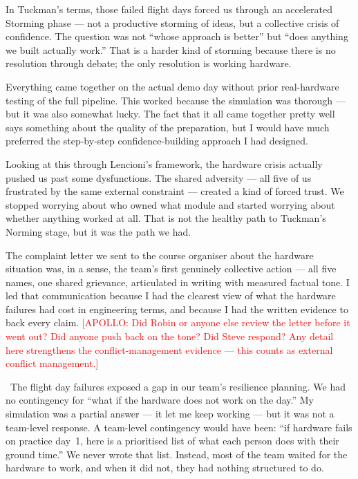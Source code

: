 In Tuckman's terms, those failed flight days forced us through an accelerated Storming phase --- not a productive storming of ideas, but a collective crisis of confidence. The question was not ``whose approach is better'' but ``does anything we built actually work.'' That is a harder kind of storming because there is no resolution through debate; the only resolution is working hardware.

Everything came together on the actual demo day without prior real-hardware testing of the full pipeline. This worked because the simulation was thorough --- but it was also somewhat lucky. The fact that it all came together pretty well says something about the quality of the preparation, but I would have much preferred the step-by-step confidence-building approach I had designed.

Looking at this through Lencioni's framework, the hardware crisis actually pushed us past some dysfunctions. The shared adversity --- all five of us frustrated by the same external constraint --- created a kind of forced trust. We stopped worrying about who owned what module and started worrying about whether anything worked at all. That is not the healthy path to Tuckman's Norming stage, but it was the path we had.

The complaint letter we sent to the course organiser about the hardware situation was, in a sense, the team's first genuinely collective action --- all five names, one shared grievance, articulated in writing with measured factual tone. I led that communication because I had the clearest view of what the hardware failures had cost in engineering terms, and because I had the written evidence to back every claim. \textcolor{red}{[APOLLO: Did Robin or anyone else review the letter before it went out? Did anyone push back on the tone? Did Steve respond? Any detail here strengthens the conflict-management evidence --- this counts as external conflict management.]}

\ebi\ The flight day failures exposed a gap in our team's resilience planning. We had no contingency for ``what if the hardware does not work on the day.'' My simulation was a partial answer --- it let me keep working --- but it was not a team-level response. A team-level contingency would have been: ``if hardware fails on practice day~1, here is a prioritised list of what each person does with their ground time.'' We never wrote that list. Instead, most of the team waited for the hardware to work, and when it did not, they had nothing structured to do.


